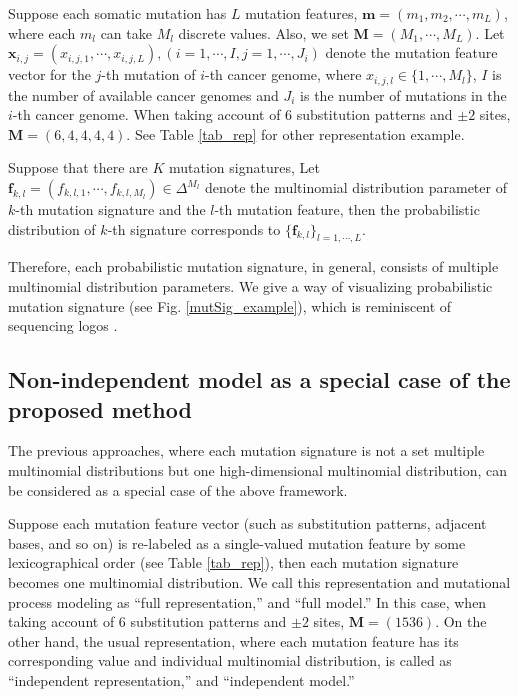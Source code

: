 Suppose each somatic mutation has $L$ mutation features, $\bm{m} = (m_1, m_2, \cdots, m_L)$, 
where each $m_l$ can take $M_l$ discrete values. Also, we set $\bm{M} = (M_1, \cdots, M_L)$.
Let $\bm{x}_{i, j} = (x_{i, j, 1}, \cdots, x_{i, j, L}), (i = 1, \cdots, I, j = 1, \cdots, J_i)$ denote the mutation feature vector for the $j$-th mutation of $i$-th cancer genome,
where $x_{i, j, l} \in \{1, \cdots, M_l \}$, $I$ is the number of available cancer genomes and $J_i$ is the number of mutations in the $i$-th cancer genome.
When taking account of 6 substitution patterns and $\pm 2$ sites,
$\bm{M} = (6, 4, 4, 4, 4)$.
See Table \ref{tab_rep} for other representation example.

Suppose that there are $K$ mutation signatures,
Let  $\bm{f}_{k, l} = (f_{k, l, 1}, \cdots, f_{k, l, M_l }) \in \Delta^{M_l}$ denote 
the multinomial distribution parameter of $k$-th mutation signature and the $l$-th mutation feature, 
then the probabilistic distribution of $k$-th signature corresponds to $\{ \bm{f}_{k, l} \}_{l=1, \cdots, L}$.
 
Therefore, each probabilistic mutation signature, in general, consists of multiple multinomial distribution parameters.
We give a way of visualizing probabilistic mutation signature (see Fig. \ref{mutSig_example}), 
which is reminiscent of sequencing logos \cite{pmid2172928}. 



\subsection*{Non-independent model as a special case of the proposed method}


The previous approaches, 
where each mutation signature is not a set multiple multinomial distributions but one high-dimensional multinomial distribution,
can be considered as a special case of the above framework.

Suppose each mutation feature vector (such as substitution patterns, adjacent bases, and so on) 
is re-labeled as a single-valued mutation feature by some lexicographical order (see Table \ref{tab_rep}),
then each mutation signature becomes one multinomial distribution. 
We call this representation and mutational process modeling as ``full representation,'' and ``full model.''
In this case, when taking account of 6 substitution patterns and $\pm 2$ sites,
$\bm{M} = (1536)$.
On the other hand, the usual representation, where each mutation feature has its corresponding value and individual multinomial distribution,
is called as ``independent representation,'' and ``independent model.''

